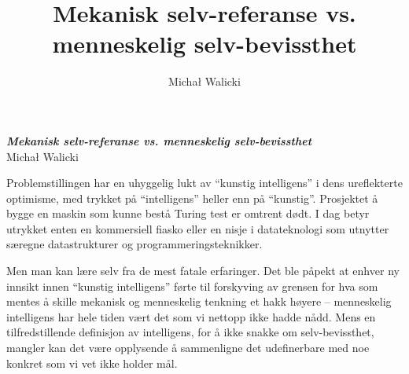 \documentclass[10pt,twocolumn,leqno]{article}
\title{Mekanisk selv-referanse vs. menneskelig selv-bevissthet}
\author{Micha{\l} Walicki}
\date{{}}
\newcommand{\<}{\langle}
\renewcommand{\>}{\rangle}
\begin{document}
\begin{center} 
 {\Large\bf\em Mekanisk selv-referanse vs. menneskelig selv-bevissthet} \\[2ex]
 Micha{\l} Walicki
\end{center}

Problemstillingen har en uhyggelig lukt av ``kunstig intelligens'' i dens 
ureflekterte optimisme, med trykket p{\aa} ``intelligens'' heller enn 
p{\aa} ``kunstig''. 
Prosjektet {\aa} bygge en maskin 
som kunne best{\aa} Turing test
 er omtrent d{\o}dt.
I dag betyr utrykket enten en kommersiell fiasko eller en 
nisje i datateknologi som utnytter s{\ae}regne datastrukturer og
programmeringsteknikker.

Men man kan l{\ae}re selv fra de mest fatale erfaringer.
Det ble p{\aa}pekt at enhver ny innsikt innen ``kunstig intelligens'' 
f{\o}rte til forskyving av grensen for hva som 
mentes {\aa} skille mekanisk og menneskelig tenkning et hakk h{\o}yere -- 
menneskelig intelligens har hele tiden v{\ae}rt det som vi nettopp ikke hadde 
n{\aa}dd. 
 Mens en tilfredstillende definisjon 
av intelligens, for {\aa} ikke snakke om selv-bevissthet, 
 mangler
kan det v{\ae}re opplysende {\aa} sammenligne det udefinerbare med noe 
konkret som vi vet ikke holder m{\aa}l. 

\end{document}
